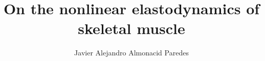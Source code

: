 \documentclass{sfuthesis}
\title{On the nonlinear elastodynamics of skeletal muscle}
\author{Javier Alejandro Almonacid Paredes}
\numberwithin{equation}{section}
\numberwithin{figure}{chapter}
\numberwithin{table}{chapter}
\theoremstyle{definition}
\begin{document}
\frontmatter
\maketitle{}
\makecommittee{}


\begin{abstract}



\end{abstract}
\end{document}
